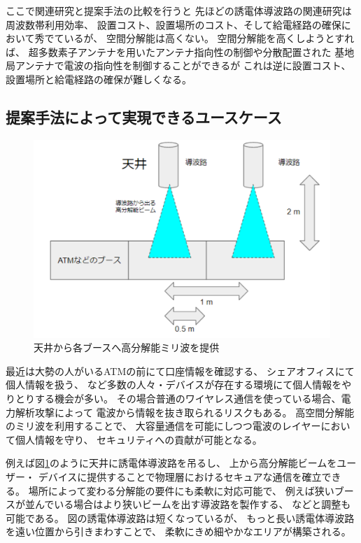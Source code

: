 \documentclass[technicalreport]{ieicej}
\begin{document}
ここで関連研究と提案手法の比較を行うと
先ほどの誘電体導波路の関連研究は周波数帯利用効率、
設置コスト、設置場所のコスト、そして給電経路の確保において秀でているが、
空間分解能は高くない。
空間分解能を高くしようとすれば、
超多数素子アンテナを用いたアンテナ指向性の制御や分散配置された
基地局アンテナで電波の指向性を制御することができるが
これは逆に設置コスト、設置場所と給電経路の確保が難しくなる。

\subsection{提案手法によって実現できるユースケース}

\begin{figure}[tb]
  \vspace{20mm}
  \begin{center}
    \includegraphics[bb=0 0 384 262, width=0.7\linewidth]{img/usecase.pdf}
    \caption{天井から各ブースへ高分解能ミリ波を提供}
    \label{fig:usecase}
  \end{center}
\end{figure}


最近は大勢の人がいるATMの前にて口座情報を確認する、
シェアオフィスにて個人情報を扱う、
など多数の人々・デバイスが存在する環境にて個人情報をやりとりする機会が多い。
その場合普通のワイヤレス通信を使っている場合、電力解析攻撃によって
電波から情報を抜き取られるリスクもある。
高空間分解能のミリ波を利用することで、
大容量通信を可能にしつつ電波のレイヤーにおいて個人情報を守り、
セキュリティへの貢献が可能となる。

例えば図\ref{fig:usecase}のように天井に誘電体導波路を吊るし、
上から高分解能ビームをユーザー・
デバイスに提供することで物理層におけるセキュアな通信を確立できる。
場所によって変わる分解能の要件にも柔軟に対応可能で、
例えば狭いブースが並んでいる場合はより狭いビームを出す導波路を製作する、
などと調整も可能である。
図の誘電体導波路は短くなっているが、
もっと長い誘電体導波路を遠い位置から引きまわすことで、
柔軟にきめ細やかなエリアが構築される。
\end{document}
